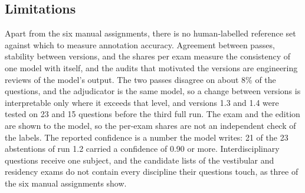 \begin{table}[t]
\centering
\footnotesize
\setlength{\tabcolsep}{4pt}
\caption{Cost of the final run on one NVIDIA B200 (191.5~GB): FP8 weights of 115.37~GiB, vLLM 0.25.0 with XGrammar and CUDA graphs, batches of 128 questions, 50 concurrent sequences, context of 20,480 tokens, output budget of 8,192 tokens, prefix caching off. \emph{Requests}: successful model requests; the six requests retried after a schema violation are excluded from the counts and included in the batch time. \emph{Batch time}: sum of the durations of the generation batches; it excludes engine start-up and export.}
\label{tab:ka-short-cost}
\end{table}

\subsection{Limitations}
\label{app:ka-short-limitations}

Apart from the six manual assignments, there is no human-labelled reference
set against which to measure annotation accuracy. Agreement between passes,
stability between versions, and the shares per exam
measure the consistency of one model with itself, and the audits that
motivated the versions are engineering reviews of the model's output. The two passes disagree on about 8\% of the
questions, and the adjudicator is the same model, so a change between versions
is interpretable only where it exceeds that level, and versions 1.3 and 1.4
were tested on 23 and 15 questions before the third full run. The exam and
the edition are shown to the model, so the per-exam shares are not an
independent check of the labels. The reported confidence is a number the
model writes: 21 of the 23 abstentions of run 1.2 carried a confidence of 0.90
or more. Interdisciplinary questions receive one subject, and the candidate
lists of the vestibular and residency exams do not contain every discipline
their questions touch, as three of the six manual assignments show.
